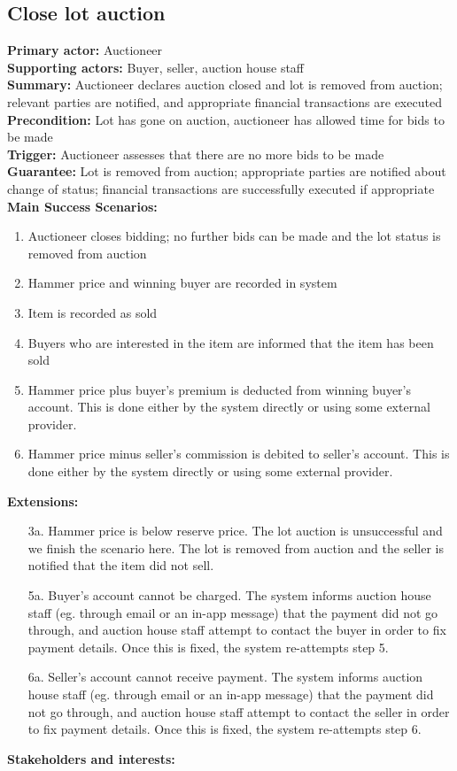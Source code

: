 \documentclass[titlepage, 12pt]{extarticle}
\begin{document}
\subsection{Close lot auction}
{\bf Primary actor: } Auctioneer 
\\{\bf Supporting actors: } Buyer, seller, auction house staff
\\{\bf Summary: } Auctioneer declares auction closed and lot is removed from auction; relevant parties are notified, and appropriate financial transactions are executed
\\{\bf Precondition: } Lot has gone on auction, auctioneer has allowed time for bids to be made
\\{\bf Trigger: } Auctioneer assesses that there are no more bids to be made
\\{\bf Guarantee: } Lot is removed from auction; appropriate parties are notified about change of status; financial transactions are successfully executed if appropriate
\\{\bf Main Success Scenarios: }
\begin{enumerate}
\item Auctioneer closes bidding; no further bids can be made and the lot status is removed from auction
\item Hammer price and winning buyer are recorded in system
\item Item is recorded as sold
\item Buyers who are interested in the item are informed that the item has been sold
\item Hammer price plus buyer's premium is deducted from winning buyer's account. This is done either by the system directly or using some external provider. 
\item Hammer price minus seller's commission is debited to seller's account. This is done either by the system directly or using some external provider. 
\end{enumerate}
{\bf Extensions: }
\begin{itemize}
\item [3a.] Hammer price is below reserve price. The lot auction is unsuccessful and we finish the scenario here. The lot is removed from auction and the seller is notified that the item did not sell. 
\item [5a.] Buyer's account cannot be charged.  The system informs auction house staff (eg. through email or an in-app message) that the payment did not go through, and auction house staff attempt to contact the buyer in order to fix payment details. Once this is fixed, the system re-attempts step 5. 
\item [6a.] Seller's account cannot receive payment. The system informs auction house staff (eg. through email or an in-app message) that the payment did not go through, and auction house staff attempt to contact the seller in order to fix payment details. Once this is fixed, the system re-attempts step 6. 
\end{itemize}
{\bf Stakeholders and interests: }
\end{document}
